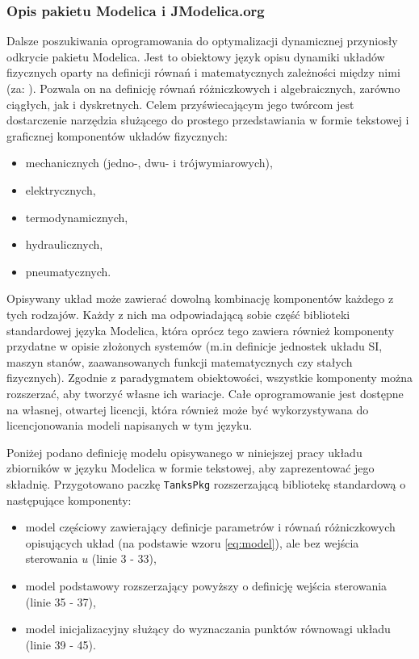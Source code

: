\subsubsection{Opis pakietu Modelica i JModelica.org}

Dalsze poszukiwania oprogramowania do optymalizacji dynamicznej przyniosły odkrycie pakietu Modelica. Jest to obiektowy język opisu dynamiki układów fizycznych oparty na definicji równań i matematycznych zależności między nimi (za: \cite{ModelicaWebsite}). Pozwala on na definicję równań różniczkowych i algebraicznych, zarówno ciągłych, jak i dyskretnych.
Celem przyświecającym jego twórcom jest dostarczenie narzędzia służącego do prostego przedstawiania w formie tekstowej i graficznej komponentów układów fizycznych:
\begin{itemize}
    \item mechanicznych (jedno-, dwu- i trójwymiarowych),
    \item elektrycznych,
    \item termodynamicznych,
    \item hydraulicznych,
    \item pneumatycznych.
\end{itemize}

Opisywany układ może zawierać dowolną kombinację komponentów każdego z tych rodzajów. Każdy z nich ma odpowiadającą sobie część biblioteki standardowej języka Modelica, która oprócz tego zawiera również komponenty przydatne w opisie złożonych systemów (m.in definicje jednostek układu SI, maszyn stanów, zaawansowanych funkcji matematycznych czy stałych fizycznych). Zgodnie z paradygmatem obiektowości, wszystkie komponenty można rozszerzać, aby tworzyć własne ich wariacje.
Całe oprogramowanie jest dostępne na własnej, otwartej licencji, która również może być wykorzystywana do licencjonowania modeli napisanych w tym języku.

Poniżej podano definicję modelu opisywanego w niniejszej pracy układu zbiorników w języku Modelica w formie tekstowej, aby zaprezentować jego składnię. Przygotowano paczkę \texttt{TanksPkg} rozszerzającą bibliotekę standardową o następujące komponenty:
\begin{itemize}
    \item model częściowy zawierający definicje parametrów i równań różniczkowych opisujących układ (na podstawie wzoru \ref{eq:model}), ale bez wejścia sterowania $u$ (linie 3 - 33),
    \item model podstawowy rozszerzający powyższy o definicję wejścia sterowania (linie 35 - 37),
    \item model inicjalizacyjny służący do wyznaczania punktów równowagi układu (linie 39 - 45).
\end{itemize}

